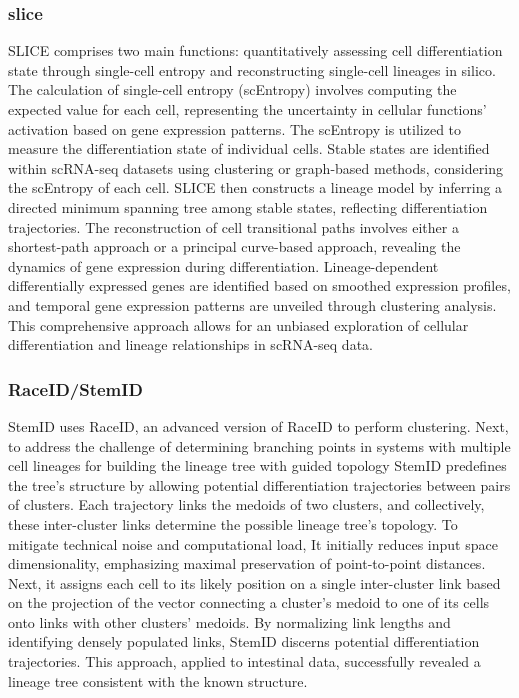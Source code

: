 \subsubsection{slice} 
SLICE comprises two main functions: quantitatively assessing cell differentiation state through single-cell entropy and reconstructing single-cell lineages in silico. The calculation of single-cell entropy (scEntropy) involves computing the expected value for each cell, representing the uncertainty in cellular functions' activation based on gene expression patterns. The scEntropy is utilized to measure the differentiation state of individual cells. Stable states are identified within scRNA-seq datasets using clustering or graph-based methods, considering the scEntropy of each cell. SLICE then constructs a lineage model by inferring a directed minimum spanning tree among stable states, reflecting differentiation trajectories. The reconstruction of cell transitional paths involves either a shortest-path approach or a principal curve-based approach, revealing the dynamics of gene expression during differentiation. Lineage-dependent differentially expressed genes are identified based on smoothed expression profiles, and temporal gene expression patterns are unveiled through clustering analysis. This comprehensive approach allows for an unbiased exploration of cellular differentiation and lineage relationships in scRNA-seq data.
\subsubsection{RaceID/StemID} 
StemID uses RaceID, an advanced version of RaceID to perform clustering. Next, to address the challenge of determining branching points in systems with multiple cell lineages for building the lineage tree with guided topology StemID predefines the tree's structure by allowing potential differentiation trajectories between pairs of clusters. Each trajectory links the medoids of two clusters, and collectively, these inter-cluster links determine the possible lineage tree's topology. To mitigate technical noise and computational load, It initially reduces input space dimensionality, emphasizing maximal preservation of point-to-point distances. Next, it assigns each cell to its likely position on a single inter-cluster link based on the projection of the vector connecting a cluster's medoid to one of its cells onto links with other clusters' medoids. By normalizing link lengths and identifying densely populated links, StemID discerns potential differentiation trajectories. This approach, applied to intestinal data, successfully revealed a lineage tree consistent with the known structure.
